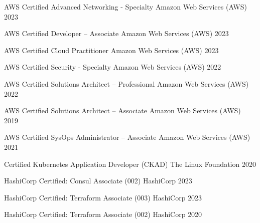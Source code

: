 \documentclass[../cv.tex]{subfiles}
\begin{document}


\begin{cvhonors}

  \cvhonor
    {AWS Certified Advanced Networking - Specialty} %
    {Amazon Web Services (AWS)} %
    {} %
    {2023} %

  \cvhonor
    {AWS Certified Developer – Associate} %
    {Amazon Web Services (AWS)} %
    {} %
    {2023} %

  \cvhonor
    {AWS Certified Cloud Practitioner} %
    {Amazon Web Services (AWS)} %
    {} %
    {2023} %

  \cvhonor
    {AWS Certified Security - Specialty} %
    {Amazon Web Services (AWS)} %
    {} %
    {2022} %

  \cvhonor
    {AWS Certified Solutions Architect – Professional} %
    {Amazon Web Services (AWS)} %
    {} %
    {2022} %

  \cvhonor
    {AWS Certified Solutions Architect – Associate} %
    {Amazon Web Services (AWS)} %
    {} %
    {2019} %

  \cvhonor
    {AWS Certified SysOps Administrator – Associate} %
    {Amazon Web Services (AWS)} %
    {} %
    {2021} %

  \cvhonor
    {Certified Kubernetes Application Developer (CKAD)} %
    {The Linux Foundation} %
    {} %
    {2020} %

  \cvhonor
    {HashiCorp Certified: Consul Associate (002)} %
    {HashiCorp} %
    {} %
    {2023} %

  \cvhonor
    {HashiCorp Certified: Terraform Associate (003)} %
    {HashiCorp} %
    {} %
    {2023} %

  \cvhonor
    {HashiCorp Certified: Terraform Associate (002)} %
    {HashiCorp} %
    {} %
    {2020} %

\end{cvhonors}
\end{document}
